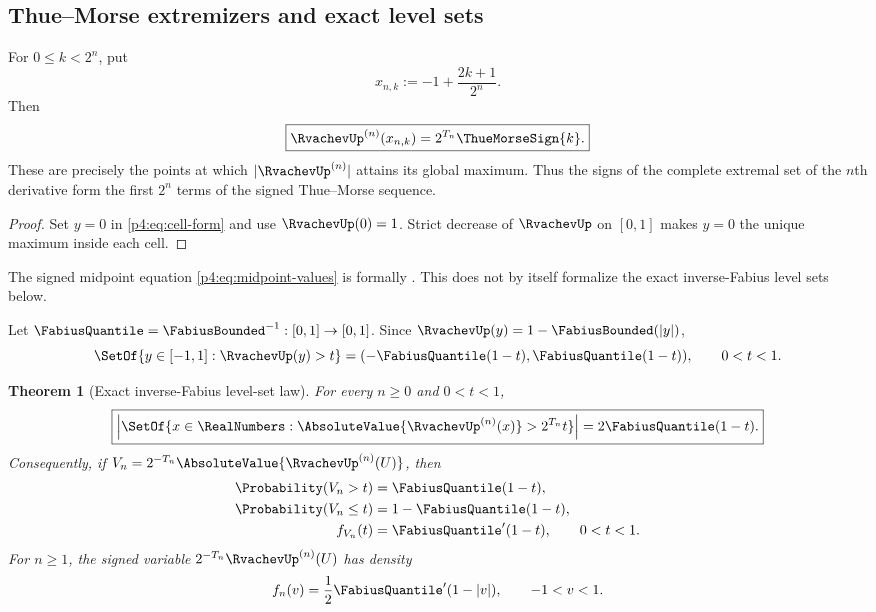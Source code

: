 \documentclass[11pt,oneside]{article}
\newtheorem{theorem}{Theorem}[section]
\theoremstyle{definition}
\theoremstyle{remark}
\begin{document}
\subsection{Thue--Morse extremizers and exact level sets}

\begin{corollary}
\label{p4:cor:midpoint-extrema}
For $0\leq k<2^n$, put
\begin{equation}
 x_{n,k}:=-1+\frac{2k+1}{2^n}.
 \label{p4:eq:cell-midpoints}
\end{equation}
Then
\begin{equation}
 \boxed{
 \RvachevUp^{(n)}(x_{n,k})=2^{T_n}\ThueMorseSign{k}.}
 \label{p4:eq:midpoint-values}
\end{equation}
These are precisely the points at which $|\RvachevUp^{(n)}|$ attains its global maximum.
Thus the signs of the complete extremal set of the $n$th derivative form the first $2^n$
terms of the signed Thue--Morse sequence.
\end{corollary}

\begin{proof}
Set $y=0$ in \eqref{p4:eq:cell-form} and use $\RvachevUp(0)=1$.  Strict decrease of $\RvachevUp$ on
$[0,1]$ makes $y=0$ the unique maximum inside each cell.
\end{proof}

The signed midpoint equation \eqref{p4:eq:midpoint-values} is formally
.  This does not by itself formalize the exact
inverse-Fabius level sets below.

Let $\FabiusQuantile=\FabiusBounded^{-1}:[0,1]\to[0,1]$.  Since
$\RvachevUp(y)=1-\FabiusBounded(|y|)$,
\begin{equation}
 \SetOf{y\in[-1,1]:\RvachevUp(y)>t}
 =(-\FabiusQuantile(1-t),\FabiusQuantile(1-t)),\qquad0<t<1.
 \label{p4:eq:up-level-set}
\end{equation}

\begin{theorem}[Exact inverse-Fabius level-set law]
\label{p4:thm:level-set-law}
For every $n\geq0$ and $0<t<1$,
\begin{equation}
 \boxed{
 \left|\SetOf{x\in\RealNumbers:
 \AbsoluteValue{\RvachevUp^{(n)}(x)}>2^{T_n}t}\right|
 =2\FabiusQuantile(1-t).}
 \label{p4:eq:derivative-level-set}
\end{equation}
Consequently, if $V_n=2^{-T_n}\AbsoluteValue{\RvachevUp^{(n)}(U)}$, then
\begin{align}
 \Probability(V_n>t)&=\FabiusQuantile(1-t),\label{p4:eq:V-tail}\\
 \Probability(V_n\leq t)&=1-\FabiusQuantile(1-t),\label{p4:eq:V-cdf}\\
 f_{V_n}(t)&=\FabiusQuantile'(1-t),\qquad0<t<1.
 \label{p4:eq:V-density}
\end{align}
For $n\geq1$, the signed variable $2^{-T_n}\RvachevUp^{(n)}(U)$ has density
\begin{equation}
 f_n(v)=\frac12\FabiusQuantile'(1-|v|),\qquad-1<v<1.
 \label{p4:eq:signed-value-density}
\end{equation}
\end{theorem}
\end{document}
